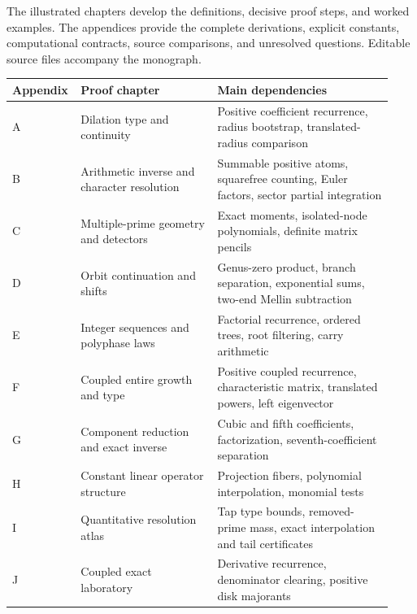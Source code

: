 The illustrated chapters develop the definitions, decisive proof steps, and worked examples. The appendices provide the complete derivations, explicit constants, computational contracts, source comparisons, and unresolved questions. Editable source files accompany the monograph.

\begingroup\small\renewcommand{\arraystretch}{1.15}
\begin{tabular}{@{}P{0.13\linewidth}P{0.35\linewidth}P{0.45\linewidth}@{}}
\toprule
Appendix & Proof chapter & Main dependencies\\\midrule
A & Dilation type and continuity & Positive coefficient recurrence, radius bootstrap, translated-radius comparison\\
B & Arithmetic inverse and character resolution & Summable positive atoms, squarefree counting, Euler factors, sector partial integration\\
C & Multiple-prime geometry and detectors & Exact moments, isolated-node polynomials, definite matrix pencils\\
D & Orbit continuation and shifts & Genus-zero product, branch separation, exponential sums, two-end Mellin subtraction\\
E & Integer sequences and polyphase laws & Factorial recurrence, ordered trees, root filtering, carry arithmetic\\
F & Coupled entire growth and type & Positive coupled recurrence, characteristic matrix, translated powers, left eigenvector\\
G & Component reduction and exact inverse & Cubic and fifth coefficients, factorization, seventh-coefficient separation\\
H & Constant linear operator structure & Projection fibers, polynomial interpolation, monomial tests\\
I & Quantitative resolution atlas & Tap type bounds, removed-prime mass, exact interpolation and tail certificates\\
J & Coupled exact laboratory & Derivative recurrence, denominator clearing, positive disk majorants\\
\bottomrule\end{tabular}\endgroup

\clearpage\appendix\RCAppendixtrue

\clearpage
\clearpage
\clearpage
\clearpage
